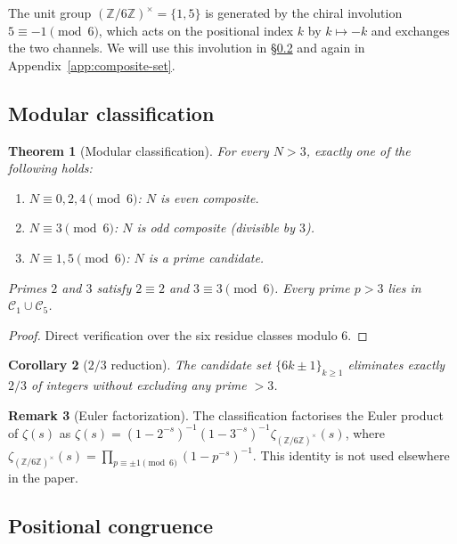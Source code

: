 \documentclass[11pt]{amsart}
\numberwithin{equation}{section}
\newcommand{\ZZ}{\mathbb{Z}}
\newcommand{\Cone}{\mathcal{C}_1}
\newcommand{\Cfive}{\mathcal{C}_5}
\theoremstyle{plain}
\newtheorem{theorem}{Theorem}[section]
\newtheorem{corollary}[theorem]{Corollary}
\theoremstyle{definition}
\newtheorem{remark}[theorem]{Remark}
\begin{document}
The unit group $(\ZZ/6\ZZ)^\times=\{1,5\}$ is generated by the chiral
involution $5\equiv-1\pmod 6$, which acts on the positional index $k$
by $k\mapsto -k$ and exchanges the two channels. We will use this
involution in \S\ref{subsec:congruence} and again in
Appendix~\ref{app:composite-set}.

\subsection{Modular classification}
\label{subsec:classification}

\begin{theorem}[Modular classification]
\label{thm:classification}
For every $N>3$, exactly one of the following holds:
\begin{enumerate}
\item[(i)] $N\equiv 0,2,4\pmod 6$: $N$ is even composite.
\item[(ii)] $N\equiv 3\pmod 6$: $N$ is odd composite (divisible by $3$).
\item[(iii)] $N\equiv 1,5\pmod 6$: $N$ is a prime candidate.
\end{enumerate}
Primes $2$ and $3$ satisfy $2\equiv 2$ and $3\equiv 3\pmod 6$. Every
prime $p>3$ lies in $\Cone\cup\Cfive$.
\end{theorem}

\begin{proof}
Direct verification over the six residue classes modulo $6$.
\end{proof}

\begin{corollary}[$2/3$ reduction]
\label{cor:reduction}
The candidate set $\{6k\pm 1\}_{k\ge 1}$ eliminates exactly $2/3$ of
integers without excluding any prime $>3$.
\end{corollary}

\begin{remark}[Euler factorization]
\label{rem:zeta}
The classification factorises the Euler product of $\zeta(s)$ as
$\zeta(s)=(1-2^{-s})^{-1}(1-3^{-s})^{-1}\zeta_{(\ZZ/6\ZZ)^\times}(s)$,
where $\zeta_{(\ZZ/6\ZZ)^\times}(s)=\prod_{p\equiv\pm1\pmod 6}(1-p^{-s})^{-1}$.
This identity is not used elsewhere in the paper.
\end{remark}

\subsection{Positional congruence}
\label{subsec:congruence}
\end{document}
